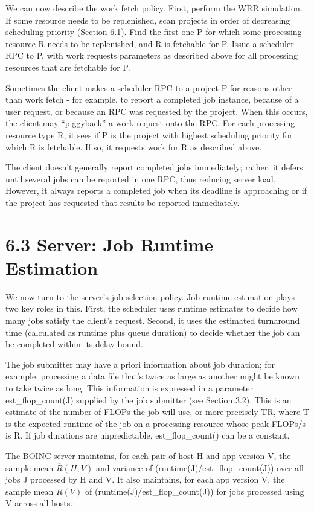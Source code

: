 \documentclass[
]{article}
\begin{document}
We can now describe the work fetch policy. First, perform the WRR
simulation. If some resource needs to be replenished, scan projects in
order of decreasing scheduling priority (Section 6.1). Find the first
one P for which some processing resource R needs to be replenished, and
R is fetchable for P. Issue a scheduler RPC to P, with work requests
parameters as described above for all processing resources that are
fetchable for P.

Sometimes the client makes a scheduler RPC to a project P for reasons
other than work fetch - for example, to report a completed job instance,
because of a user request, or because an RPC was requested by the
project. When this occurs, the client may ``piggyback'' a work request
onto the RPC. For each processing resource type R, it sees if P is the
project with highest scheduling priority for which R is fetchable. If
so, it requests work for R as described above.

The client doesn't generally report completed jobs immediately; rather,
it defers until several jobs can be reported in one RPC, thus reducing
server load. However, it always reports a completed job when its
deadline is approaching or if the project has requested that results be
reported immediately.

\section{6.3 Server: Job Runtime
Estimation}\label{server-job-runtime-estimation}

We now turn to the server's job selection policy. Job runtime estimation
plays two key roles in this. First, the scheduler uses runtime estimates
to decide how many jobs satisfy the client's request. Second, it uses
the estimated turnaround time (calculated as runtime plus queue
duration) to decide whether the job can be completed within its delay
bound.

The job submitter may have a priori information about job duration; for
example, processing a data file that's twice as large as another might
be known to take twice as long. This information is expressed in a
parameter est\_flop\_count(J) supplied by the job submitter (see Section
3.2). This is an estimate of the number of FLOPs the job will use, or
more precisely TR, where T is the expected runtime of the job on a
processing resource whose peak FLOPs/s is R. If job durations are
unpredictable, est\_flop\_count() can be a constant.

The BOINC server maintains, for each pair of host H and app version V,
the sample mean \(\overline{R}(H, V)\) and variance of
(runtime(J)/est\_flop\_count(J)) over all jobs J processed by H and V.
It also maintains, for each app version V, the sample mean
\(\overline{R}(V)\) of (runtime(J)/est\_flop\_count(J)) for jobs
processed using V across all hosts.
\end{document}
